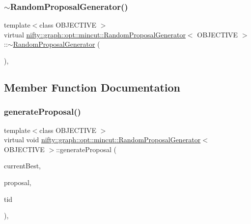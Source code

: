 \subsubsection{\texorpdfstring{$\sim$\+Random\+Proposal\+Generator()}{~RandomProposalGenerator()}}
{\footnotesize\ttfamily template$<$class O\+B\+J\+E\+C\+T\+I\+VE $>$ \\
virtual \hyperlink{classnifty_1_1graph_1_1opt_1_1mincut_1_1RandomProposalGenerator}{nifty\+::graph\+::opt\+::mincut\+::\+Random\+Proposal\+Generator}$<$ O\+B\+J\+E\+C\+T\+I\+VE $>$\+::$\sim$\hyperlink{classnifty_1_1graph_1_1opt_1_1mincut_1_1RandomProposalGenerator}{Random\+Proposal\+Generator} (\begin{DoxyParamCaption}{ }\end{DoxyParamCaption})\hspace{0.3cm}{\ttfamily [inline]}, {\ttfamily [virtual]}}



\subsection{Member Function Documentation}
\mbox{\label{classnifty_1_1graph_1_1opt_1_1mincut_1_1RandomProposalGenerator_ad7a71f08676a1e356b6480c85ad0ab53}} 
\subsubsection{\texorpdfstring{generate\+Proposal()}{generateProposal()}}
{\footnotesize\ttfamily template$<$class O\+B\+J\+E\+C\+T\+I\+VE $>$ \\
virtual void \hyperlink{classnifty_1_1graph_1_1opt_1_1mincut_1_1RandomProposalGenerator}{nifty\+::graph\+::opt\+::mincut\+::\+Random\+Proposal\+Generator}$<$ O\+B\+J\+E\+C\+T\+I\+VE $>$\+::generate\+Proposal (\begin{DoxyParamCaption}\item[{const \hyperlink{classnifty_1_1graph_1_1opt_1_1mincut_1_1ProposalGeneratorBase_a8e7bdb52139e951b4d4fc21c3cc6946a}{Node\+Labels} \&}]{current\+Best,  }\item[{\hyperlink{classnifty_1_1graph_1_1opt_1_1mincut_1_1ProposalGeneratorBase_a8e7bdb52139e951b4d4fc21c3cc6946a}{Node\+Labels} \&}]{proposal,  }\item[{const size\+\_\+t}]{tid }\end{DoxyParamCaption})\hspace{0.3cm}{\ttfamily [inline]}, {\ttfamily [virtual]}}



